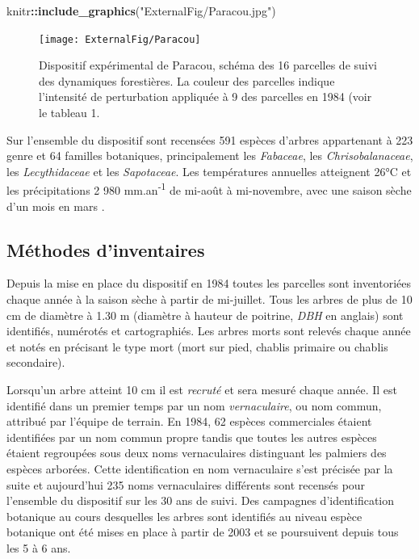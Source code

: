 \documentclass[
  11pt,
  french,
  A4paper,
  extrafontsizes,onecolumn,openright
  ]{memoir}
\newenvironment{Shaded}{\begin{snugshade}}{\end{snugshade}}
\newcommand{\KeywordTok}[1]{\textcolor[rgb]{0.13,0.29,0.53}{\textbf{#1}}}
\newcommand{\StringTok}[1]{\textcolor[rgb]{0.31,0.60,0.02}{#1}}
\newcommand{\OperatorTok}[1]{\textcolor[rgb]{0.81,0.36,0.00}{\textbf{#1}}}
\newcommand{\NormalTok}[1]{#1}
\begin{document}
\begin{Shaded}
\begin{Highlighting}[]
\NormalTok{knitr}\OperatorTok{::}\KeywordTok{include_graphics}\NormalTok{(}\StringTok{"ExternalFig/Paracou.jpg"}\NormalTok{)}
\end{Highlighting}
\end{Shaded}

\begin{figure}

{\centering \texttt{[image: ExternalFig/Paracou]} 

}

\caption{Dispositif expérimental de Paracou, schéma des 16 parcelles de suivi des dynamiques forestières. La couleur des parcelles indique l'intensité de perturbation appliquée à 9 des parcelles en 1984 (voir le tableau 1.}\label{fig:ParacouDesign}
\end{figure}

Sur l'ensemble du dispositif sont recensées 591 espèces d'arbres
appartenant à 223 genre et 64 familles botaniques, principalement les
\emph{Fabaceae}, les \emph{Chrisobalanaceae}, les \emph{Lecythidaceae}
et les \emph{Sapotaceae}. Les températures annuelles atteignent 26°C et
les précipitations 2 980 mm.an\textsuperscript{-1} de mi-août à
mi-novembre, avec une saison sèche d'un mois en mars
\autocite{Wagner2011}.

\subsection{Méthodes d'inventaires}\label{methodes-dinventaires}

Depuis la mise en place du dispositif en 1984 toutes les parcelles sont
inventoriées chaque année à la saison sèche à partir de mi-juillet. Tous
les arbres de plus de 10 cm de diamètre à 1.30 m (diamètre à hauteur de
poitrine, \emph{DBH} en anglais) sont identifiés, numérotés et
cartographiés. Les arbres morts sont relevés chaque année et notés en
précisant le type mort (mort sur pied, chablis primaire ou chablis
secondaire).

Lorsqu'un arbre atteint 10 cm il est \emph{recruté} et sera mesuré
chaque année. Il est identifié dans un premier temps par un nom
\emph{vernaculaire}, ou nom commun, attribué par l'équipe de terrain. En
1984, 62 espèces commerciales étaient identifiées par un nom commun
propre tandis que toutes les autres espèces étaient regroupées sous deux
noms vernaculaires distinguant les palmiers des espèces arborées. Cette
identification en nom vernaculaire s'est précisée par la suite et
aujourd'hui 235 noms vernaculaires différents sont recensés pour
l'ensemble du dispositif sur les 30 ans de suivi. Des campagnes
d'identification botanique au cours desquelles les arbres sont
identifiés au niveau espèce botanique ont été mises en place à partir de
2003 et se poursuivent depuis tous les 5 à 6 ans.
\end{document}
